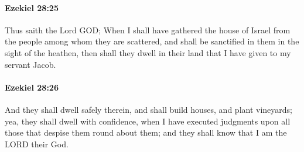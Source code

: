 		\paragraph{Ezekiel 28:25} %
			\label{EZEKIEL-28-25}

			Thus saith the Lord GOD; When I shall have gathered the house of Israel from the people among whom they are scattered, and shall be sanctified in them in the sight of the heathen, then shall they dwell in their land that I have given to my servant Jacob.


		\paragraph{Ezekiel 28:26} %
			\label{EZEKIEL-28-26}

			And they shall dwell safely therein, and shall build houses, and plant vineyards; yea, they shall dwell with confidence, when I have executed judgments upon all those that despise them round about them; and they shall know that I am the LORD their God.

